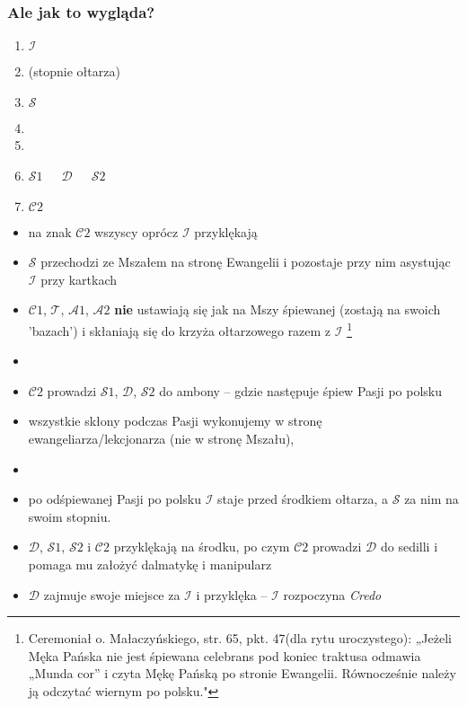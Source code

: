     \subsubsection*{\textbf{Ale jak to wygląda?}}

    \begin{enumerate}\centering
     \item[] $\mathcal{I}$
     \item[] (stopnie ołtarza)
     \item[] $\mathcal{S}$
     \item[] 
     \item[] 
     \item[] $\mathcal{S}1$~~~$\mathcal{D}$~~~$\mathcal{S}2$
     \item[] $\mathcal{C}2$
    \end{enumerate}
    
    
    \begin{itemize}
     \item na znak $\mathcal{C}2$ wszyscy oprócz $\mathcal{I}$ przyklękają 
     \item $\mathcal{S}$ przechodzi ze Mszałem na stronę Ewangelii i pozostaje przy nim asystując $\mathcal{I}$ przy kartkach 
     \item $\mathcal{C}1$, $\mathcal{T}$, $\mathcal{A}1$, $\mathcal{A}2$ \textbf{nie} ustawiają się jak na Mszy śpiewanej (zostają na swoich 'bazach') i skłaniają się do krzyża ołtarzowego razem z $\mathcal{I}$ \footnote{Ceremoniał o. Małaczyńskiego, str. 65, pkt. 47(dla rytu uroczystego): „Jeżeli Męka Pańska nie jest śpiewana celebrans pod koniec traktusa odmawia „Munda cor” i czyta Mękę Pańską po stronie Ewangelii. Równocześnie należy ją odczytać wiernym  po polsku."}
     \item[]
     \item $\mathcal{C}2$ prowadzi $\mathcal{S}1$, $\mathcal{D}$, $\mathcal{S}2$ do ambony – gdzie następuje śpiew Pasji po polsku
     \item wszystkie skłony podczas Pasji wykonujemy w stronę ewangeliarza/lekcjonarza (nie w stronę Mszału),
     \item[]
     \item po odśpiewanej Pasji po polsku $\mathcal{I}$ staje przed środkiem ołtarza, a $\mathcal{S}$ za nim na swoim stopniu. 
     \item $\mathcal{D}$, $\mathcal{S}1$, $\mathcal{S}2$ i $\mathcal{C}2$ przyklękają na środku, po czym $\mathcal{C}2$ prowadzi $\mathcal{D}$ do sedilli i pomaga mu założyć dalmatykę i manipularz 
     \item $\mathcal{D}$ zajmuje swoje miejsce za $\mathcal{I}$ i przyklęka -- $\mathcal{I}$ rozpoczyna \textit{Credo}
    \end{itemize}

